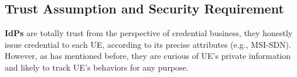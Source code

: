 

\subsection{Trust Assumption and Security Requirement}

\textbf{IdPs} are totally trust from the perspective of credential business, they honestly issue credential to each UE, according to its precise attributes (e.g., MSI-SDN). However, as has mentioned before, they are curious of UE's private information and likely to track UE's behaviors for any purpose. 

